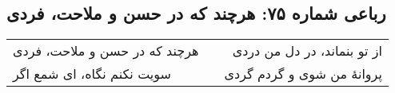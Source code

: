 \begin{center}
\section*{رباعی شماره ۷۵: هرچند که در حسن و ملاحت، فردی}
\label{sec:075}
\begin{longtable}{l p{0.5cm} r}
هرچند که در حسن و ملاحت، فردی
&&
از تو بنماند، در دل من دردی
\\
سویت نکنم نگاه، ای شمع اگر
&&
پروانهٔ من شوی و گردم گردی
\\
\end{longtable}
\end{center}
